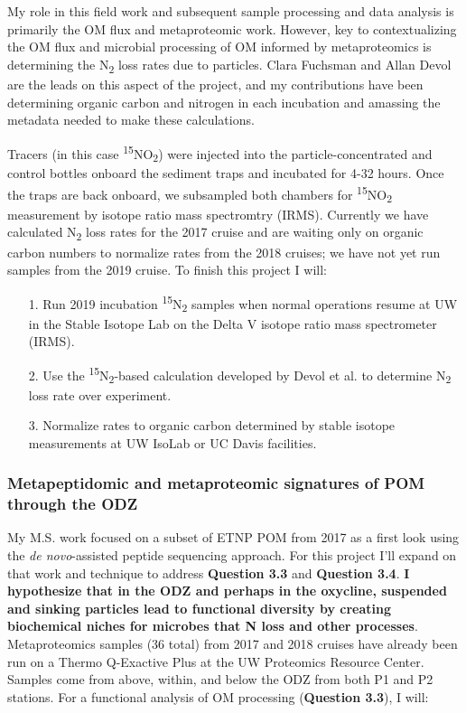\documentclass[12pt, letterpaper, twoside]{article}
\begin{document}
My role in this field work and subsequent sample processing and data analysis is primarily the OM flux and metaproteomic work. However, key to contextualizing the OM flux and microbial processing of OM informed by metaproteomics is determining the N\textsubscript{2} loss rates due to particles. Clara Fuchsman and Allan Devol are the leads on this aspect of the project, and my contributions have been determining organic carbon and nitrogen in each incubation and amassing the metadata needed to make these calculations. 

Tracers (in this case \textsuperscript{15}NO\textsubscript{2}) were injected into the particle-concentrated and control bottles onboard the sediment traps and incubated for 4-32 hours. Once the traps are back onboard, we subsampled both chambers for \textsuperscript{15}NO\textsubscript{2} measurement by isotope ratio mass spectromtry (IRMS). Currently we have calculated N\textsubscript{2} loss rates for the 2017 cruise and are waiting only on organic carbon numbers to normalize rates from the 2018 cruises; we have not yet run samples from the 2019 cruise. To finish this project I will:

\begin{enumerate}
	\item[1.] Run 2019 incubation \textsuperscript{15}N\textsubscript{2} samples when normal operations resume at UW in the Stable Isotope Lab on the Delta V isotope ratio mass spectrometer (IRMS). 
	\item[2.] Use the \textsuperscript{15}N\textsubscript{2}-based calculation developed by Devol et al. to determine N\textsubscript{2} loss rate over experiment. 
	\item [3.] Normalize rates to organic carbon determined by stable isotope measurements at UW IsoLab or UC Davis facilities. 
\end{enumerate}

\subsubsection{Metapeptidomic and metaproteomic signatures of POM through the ODZ}

My M.S. work focused on a subset of ETNP POM from 2017 as a first look using the \textit{de novo}-assisted peptide sequencing approach. For this project I'll expand on that work and technique to address \textbf{Question 3.3} and \textbf{Question 3.4}. \textbf{I hypothesize that in the ODZ and perhaps in the oxycline, suspended and sinking particles lead to functional diversity by creating biochemical niches for microbes that  N loss and other processes}. Metaproteomics samples (36 total) from 2017 and 2018 cruises have already been run on a Thermo Q-Exactive Plus at the UW Proteomics Resource Center. Samples come from above, within, and below the ODZ from both P1 and P2 stations. For a functional analysis of OM processing (\textbf{Question 3.3}), I will:
\end{document}
